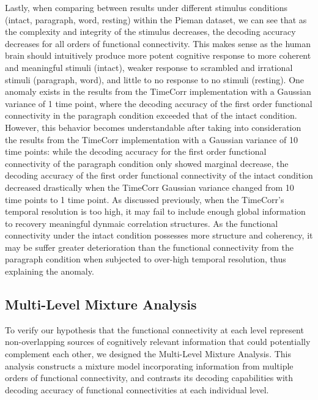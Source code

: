 \documentclass[11pt]{article}
\begin{document}
Lastly, when comparing between results under different stimulus conditions (intact, paragraph, word, resting) within the Pieman dataset, we can see that as the complexity and integrity of the stimulus decreases, the decoding accuracy decreases for all orders of functional connectivity. This makes sense as the human brain should intuitively produce more potent cognitive response to more coherent and meaningful stimuli (intact), weaker response to scrambled and irrational stimuli (paragraph, word), and little to no response to no stimuli (resting). One anomaly exists in the results from the TimeCorr implementation with a Gaussian variance of 1 time point, where the decoding accuracy of the first order functional connectivity in the paragraph condition exceeded that of the intact condition. However, this behavior becomes understandable after taking into consideration the results from the TimeCorr implementation with a Gaussian variance of 10 time points: while the decoding accuracy for the first order functional connectivity of the paragraph condition only showed marginal decrease, the decoding accuracy of the first order functional connectivity of the intact condition decreased drastically when the TimeCorr Gaussian variance changed from 10 time points to 1 time point. As discussed previously, when the TimeCorr's temporal resolution is too high, it may fail to include enough global information to recovery meaningful dynmaic correlation structures. As the functional connectivity under the intact condition possesses more structure and coherency, it may be suffer greater deterioration than the functional connectivity from the paragraph condition when subjected to over-high temporal resolution, thus explaining the anomaly.


\subsection{Multi-Level Mixture Analysis}
To verify our hypothesis that the functional connectivity at each level represent non-overlapping sources of cognitively relevant information that could potentially complement each other, we designed the Multi-Level Mixture Analysis. This analysis constructs a mixture model incorporating information from multiple orders of functional connectivity, and contrasts its decoding capabilities with decoding accuracy of functional connectivities at each individual level.
\end{document}
